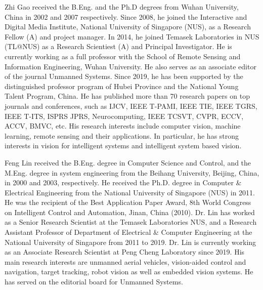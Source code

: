 \documentclass[journal]{IEEEtran}
\begin{document}
\begin{IEEEbiography}{Zhi Gao}
received the B.Eng. and the Ph.D degrees
from Wuhan University, China in 2002 and
2007 respectively. Since 2008, he joined the Interactive and Digital Media Institute, National University of Singapore (NUS), as a Research Fellow (A) and project manager. In 2014, he joined Temasek Laboratories in NUS (TL@NUS) as a Research Scientiest (A) and Principal Investigator. He is currently working as a full professor with the School of Remote Sensing
and Information Engineering, Wuhan University. He also serves as an associate editor of the journal Unmanned Systems.
Since 2019, he has been supported by the distinguished professor program of Hubei Province and the National Young Talent Program, China. He has published more than 70
research papers on top journals and conferences, such as IJCV, IEEE
T-PAMI, IEEE TIE, IEEE TGRS, IEEE T-ITS, ISPRS JPRS, Neurocomputing, IEEE TCSVT, CVPR, ECCV, ACCV, BMVC, etc. His research interests include computer vision, machine
learning, remote sensing and their applications. In particular, he has
strong interests in vision for intelligent systems and intelligent system based vision.
\end{IEEEbiography}

\begin{IEEEbiography}{Feng Lin}
 received the B.Eng. degree in Computer Science and Control, and the M.Eng. degree in system engineering from the Beihang University, Beijing, China, in 2000 and 2003, respectively. He received the Ph.D. degree in Computer \& Electrical Engineering from the National University of Singapore (NUS) in 2011. He was the recipient of the Best Application Paper Award, 8th World Congress on Intelligent Control and Automation, Jinan, China (2010).
Dr. Lin has worked as a Senior Research Scientist at the Temasek Laboratories \@ NUS, and a Research Assistant Professor of Department of Electrical \& Computer Engineering at the National University of Singapore from 2011 to 2019. 
Dr. Lin is currently working as an Associate Research Scientist at Peng Cheng Laboratory since 2019. His main research interests are unmanned aerial vehicles, vision-aided control and navigation, target tracking, robot vision as well as embedded vision systems. He has served on the editorial board for Unmanned Systems. 
\end{IEEEbiography}
\end{document}

